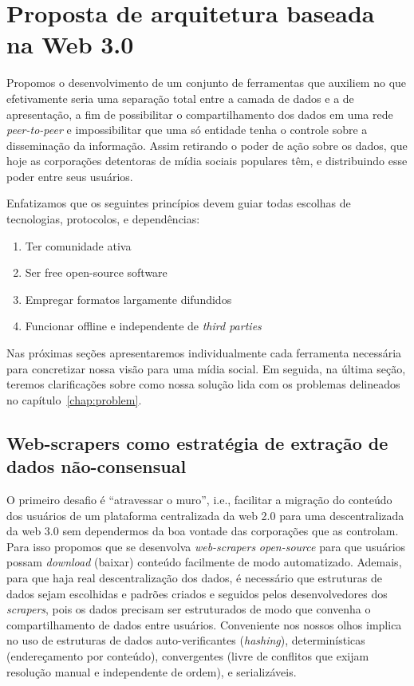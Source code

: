 \chapter{Proposta de arquitetura baseada na Web 3.0}

Propomos o desenvolvimento de um conjunto de ferramentas que auxiliem no que efetivamente seria uma separação total entre a camada de dados e a de apresentação, a fim de possibilitar o compartilhamento dos dados em uma rede \textit{peer-to-peer} e impossibilitar que uma só entidade tenha o controle sobre a disseminação da informação.
Assim retirando o poder de ação sobre os dados, que hoje as corporações detentoras de mídia sociais populares têm, e distribuindo esse poder entre seus usuários.

Enfatizamos que os seguintes princípios devem guiar todas escolhas de tecnologias, protocolos, e dependências:

\begin{enumerate}
    \item Ter comunidade ativa
    \item Ser free open-source software
    \item Empregar formatos largamente difundidos
    \item Funcionar offline e independente de \textit{third parties}
\end{enumerate}

Nas próximas seções apresentaremos individualmente cada ferramenta necessária para concretizar nossa visão para uma mídia social.
Em seguida, na última seção, teremos clarificações sobre como nossa solução lida com os problemas delineados no capítulo~\ref{chap:problem}.

\section{Web-scrapers como estratégia de extração de dados não-consensual}

O primeiro desafio é ``atravessar o muro'', i.e., facilitar a migração do conteúdo dos usuários de um plataforma centralizada da web 2.0 para uma descentralizada da web 3.0 sem dependermos da boa vontade das corporações que as controlam.
Para isso propomos que se desenvolva \textit{web-scrapers} \textit{open-source} para que usuários possam \textit{download} (baixar) conteúdo facilmente de modo automatizado.
Ademais, para que haja real descentralização dos dados, é necessário que estruturas de dados sejam escolhidas e padrões criados e seguidos pelos desenvolvedores dos \textit{scrapers}, pois os dados precisam ser estruturados de modo que convenha o compartilhamento de dados entre usuários.
Conveniente nos nossos olhos implica no uso de estruturas de dados auto-verificantes (\textit{hashing}), determinísticas (endereçamento por conteúdo), convergentes (livre de conflitos que exijam resolução manual e independente de ordem), e serializáveis.

